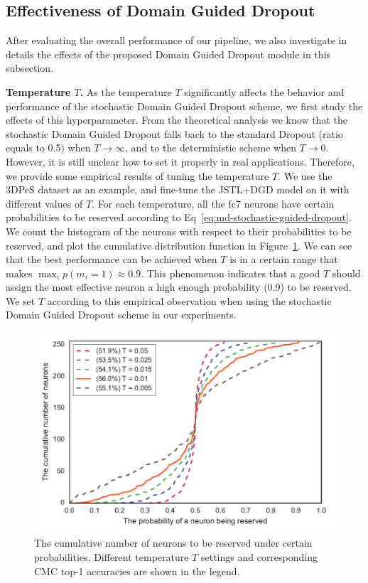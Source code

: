 \subsection{Effectiveness of Domain Guided Dropout} %
\label{sub:md-effectiveness-of-the-guided-dropout-module}

After evaluating the overall performance of our pipeline, we also investigate in details the effects of the proposed Domain Guided Dropout module in this subsection.

\textbf{Temperature $T$.} As the temperature $T$ significantly affects the behavior and performance of the stochastic Domain Guided Dropout scheme, we first study the effects of this hyperparameter. From the theoretical analysis we know that the stochastic Domain Guided Dropout falls back to the standard Dropout (ratio equals to 0.5) when $T\to \infty$, and to the deterministic scheme when $T\to 0$. However, it is still unclear how to set it properly in real applications. Therefore, we provide some empirical results of tuning the temperature $T$. We use the 3DPeS dataset as an example, and fine-tune the JSTL+DGD model on it with different values of $T$. For each temperature, all the fc7 neurons have certain probabilities to be reserved according to Eq~\eqref{eq:md-stochastic-guided-dropout}. We count the histogram of the neurons with respect to their probabilities to be reserved, and plot the cumulative distribution function in Figure~\ref{fig:md-temp-cdf}. We can see that the best performance can be achieved when $T$ is in a certain range that makes $\max_i p(m_i=1) \approx 0.9$. This phenomenon indicates that a good $T$ should assign the most effective neuron a high enough probability (0.9) to be reserved. We set $T$ according to this empirical observation when using the stochastic Domain Guided Dropout scheme  in our experiments.

\begin{figure}[t]
\begin{center}
\includegraphics[width=1.0\linewidth]{figures/multi_domain/cdf_temperature.pdf}
\end{center}
\caption{The cumulative number of neurons to be reserved under certain probabilities. Different temperature $T$ settings and corresponding CMC top-1 accuracies are shown in the legend.}
\label{fig:md-temp-cdf}
\end{figure}

